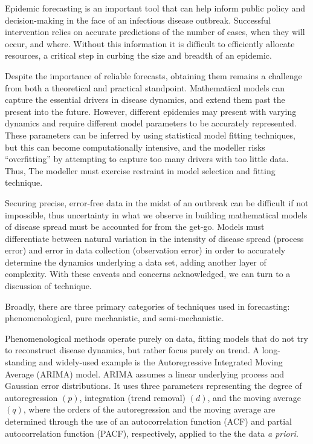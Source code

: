 Epidemic forecasting is an important tool that can help inform public policy and decision-making in the face of an infectious disease outbreak. Successful intervention relies on accurate predictions of the number of cases, when they will occur, and where. Without this information it is difficult to efficiently allocate resources, a critical step in curbing the size and breadth of an epidemic.

Despite the importance of reliable forecasts, obtaining them remains a challenge from both a theoretical and practical standpoint. Mathematical models can capture the essential drivers in disease dynamics, and extend them past the present into the future. However, different epidemics may present with varying dynamics and require different model parameters to be accurately represented. These parameters can be inferred by using statistical model fitting techniques, but this can become computationally intensive, and the modeller risks ``overfitting'' by attempting to capture too many drivers with too little data. Thus, The modeller must exercise restraint in model selection and fitting technique.

Securing precise, error-free data in the midst of an outbreak can be difficult if not impossible, thus uncertainty in what we observe in building mathematical models of disease spread must be accounted for from the get-go. Models must differentiate between natural variation in the intensity of disease spread (process error) and error in data collection (observation error) in order to accurately determine the dynamics underlying a data set, adding another layer of complexity. With these caveats and concerns acknowledged, we can turn to a discussion of technique.

Broadly, there are three primary categories of techniques used in forecasting: phenomenological, pure mechanistic, and semi-mechanistic.

Phenomenological methods operate purely on data, fitting models that do not try to reconstruct disease dynamics, but rather focus purely on trend. A long-standing and widely-used example is the Autoregressive Integrated Moving Average (ARIMA) model. ARIMA assumes a linear underlying process and Gaussian error distributions. It uses three parameters representing the degree of autoregression $(p)$, integration (trend removal) $(d)$, and the moving average $(q)$, where the orders of the autoregression and the moving average are determined through the use of an autocorrelation function (ACF) and partial autocorrelation function (PACF), respectively, applied to the the data \textit{a priori}.

